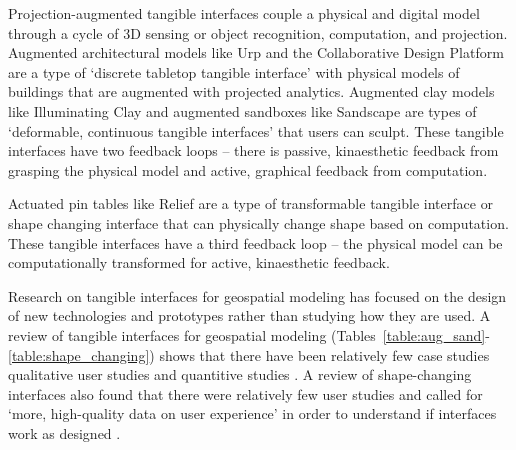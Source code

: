 \documentclass[prodmode,acmtochi]{acmsmall} %
\begin{document}
Projection-augmented tangible interfaces 
couple a physical and digital model
through a cycle of 3D sensing or object recognition,
computation, and projection. 
%
Augmented architectural models
like Urp \cite{Underkoffler1999} 
and the Collaborative Design Platform \cite{Schubert2011}
are a type of 
`discrete tabletop tangible interface' \cite{Ishii2012}
with physical models of buildings 
that are augmented with projected analytics.
%
Augmented clay models 
like Illuminating Clay \cite{Piper2002a} 
and augmented sandboxes like Sandscape \cite{Ishii2004} 
are types of 
`deformable, continuous tangible interfaces' \cite{Ishii2012}
that users can sculpt. 
%
These tangible interfaces 
have two feedback loops -- 
there is passive, kinaesthetic feedback from grasping the physical model 
and active, graphical feedback from computation.








Actuated pin tables
like Relief \cite{Leithinger2009}
are a type of transformable tangible interface \cite{Ishii2012} 
or shape changing interface \cite{Rasmussen2012}
that can physically change shape based on computation.
These tangible interfaces 
have a third feedback loop --
the physical model
can be computationally transformed
for active, kinaesthetic feedback. 


	






Research on tangible interfaces for geospatial modeling 
has focused on the design of new technologies and prototypes
rather than studying how they
are used. 
%
A review of tangible interfaces for geospatial modeling 
(Tables~\ref{table:aug_sand}-\ref{table:shape_changing})
shows that there have been 
relatively few case studies \cite{Ishii2002,Tateosian2010,Petrasova2015} 
qualitative user studies \cite{Shamonsky2003,Woods2016}
and quantitive studies \cite{Harmon2016,Harmon2016a,SchmidtDaly2016}.
%
A review of shape-changing interfaces 
also found that there were relatively few user studies
and called for `more, high-quality data on user experience'
in order to understand if interfaces work as designed
\cite{Rasmussen2012}.
\end{document}
